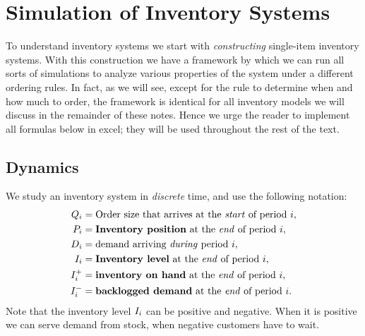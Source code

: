 \section{Simulation of Inventory Systems}
\label{sec:dynam-an-invent}



To understand inventory systems we start with \emph{constructing} single-item inventory systems. With this construction we have a framework by which we can run all sorts of simulations to analyze various properties of the system under a different ordering rules. In fact, as we will see, except for the rule to determine when and how much to order, the framework is identical for all inventory models we will discuss in the remainder of these notes. Hence we urge the reader to implement all  formulas below in excel; they will be used throughout the rest of the text. 

\subsection{Dynamics}
\label{sec:dynamics}



We study an inventory system in \emph{discrete} time, and use 
 the following notation:
\begin{align*}
  Q_i &= \text{Order size that arrives at  the \emph{start} of period $i$}, \\
  \IP_i &= \text{\recall{Inventory position} at the \emph{end} of period $i$}, \\
  D_i &= \text{demand arriving \emph{during} period $i$}, \\
  \IL_i &= \text{\recall{Inventory level} at the \emph{end} of period $i$}, \\
\IL_i^+ &= \text{\recall{inventory on hand} at the \emph{end} of period $i$}, \\
\IL_i^- &= \text{\recall{backlogged demand} at the \emph{end} of period $i$}.
\end{align*}
Note that  the inventory level $I_i$ can be positive and negative. When it is positive we can serve demand from stock, when negative customers have to wait.  

